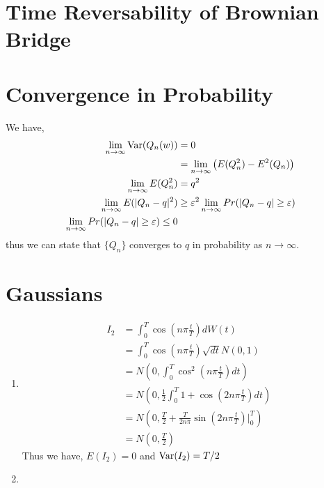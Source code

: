 \documentclass{article}
\begin{document}
\maketitle 
\setlength{\parindent}{0pt}

\section{Time Reversability of Brownian Bridge}

\section{Convergence in Probability}
    We have, 
    \begin{align*}
        \lim_{n\to\infty}\text{Var}(Q_n(w)) &= 0
        \\
        &= \lim_{n\to\infty}\left(E(Q_n^2) - E^2(Q_n)\right)
        \\
        \lim_{n\to\infty} E(Q_n^2) &= q^2
        \\
        \lim_{n\to\infty}E(|Q_n - q|^2) &\ge
        \varepsilon^2\lim_{n\to\infty}Pr(|Q_n - q| \ge \varepsilon)
        \\
        \lim_{n\to\infty}Pr(|Q_n - q| \ge \varepsilon) \le 0
    \end{align*}
    thus we can state that $\{Q_n\}$ converges to $q$ in probability as $n \to
    \infty$. 

\section{Gaussians}
    \begin{enumerate}[label=\roman*)]
        \item 
            \begin{align*}
                I_2 &= \int_0^T\cos\left(n\pi\frac{t}{T}\right)dW(t)
                \\
                &= \int_0^T\cos\left(n\pi\frac{t}{T}\right)\sqrt{dt}N(0,1)
                \\
                &= N\left(0, \int_0^T\cos^2\left(n\pi\frac{t}{T}\right)dt\right)
                \\
                &= N\left(0, \frac{1}{2}\int_0^T1 + \cos\left(2n\pi\frac{t}{T}\right)dt\right)
                \\
                &= N\left(0,
                \frac{T}{2}+\frac{T}{2n\pi}\sin\left(2n\pi\frac{t}{T}\right)\Big|_0^T\right)
                \\
                &= N\left(0, \frac{T}{2}\right)
            \end{align*}
            Thus we have, $E(I_2) = 0$ and $\text{Var}(I_2) = T/2$
        \item 
    \end{enumerate}
\end{document}
